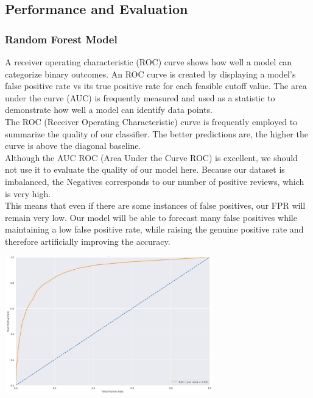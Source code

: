 \subsection{Performance and Evaluation }
\subsubsection{Random Forest Model}
A receiver operating characteristic (ROC) curve shows how well a model can categorize binary outcomes. An ROC curve is created by displaying a model's false positive rate vs its true positive rate for each feasible cutoff value. The area under the curve (AUC) is frequently measured and used as a statistic to demonstrate how well a model can identify data points.\\

The ROC (Receiver Operating Characteristic) curve is frequently employed to summarize the quality of our classifier. The better predictions are, the higher the curve is above the diagonal baseline. \\
Although the AUC ROC (Area Under the Curve ROC) is excellent, we should not use it to evaluate the quality of our model here. Because our dataset is imbalanced, the  Negatives corresponds to our number of positive reviews, which is very high. \\
This means that even if there are some instances of false positives, our FPR will remain very low. Our model will be able to forecast many false positives while maintaining a low false positive rate, while raising the genuine positive rate and therefore artificially improving the accuracy.




\includegraphics[width=9cm, height=6cm \textwidth]{roc.jpeg}\\

